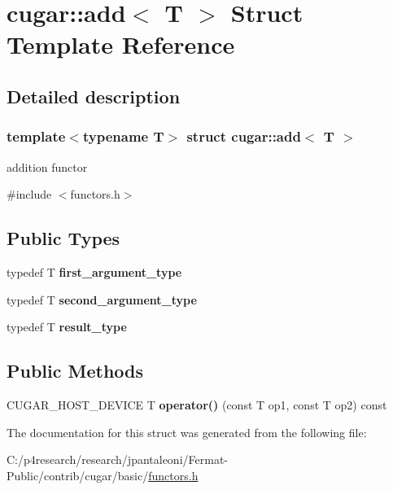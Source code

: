 \hypertarget{structcugar_1_1add}{}\section{cugar\+:\+:add$<$ T $>$ Struct Template Reference}
\label{structcugar_1_1add}


\subsection{Detailed description}
\subsubsection*{template$<$typename T$>$\newline
struct cugar\+::add$<$ T $>$}

addition functor 

{\ttfamily \#include $<$functors.\+h$>$}

\subsection*{Public Types}
\begin{DoxyCompactItemize}
\item 
\mbox{\label{structcugar_1_1add_ac7ab2b5c56d5ec89d65063ca175af238}} 
typedef T {\bfseries first\+\_\+argument\+\_\+type}
\item 
\mbox{\label{structcugar_1_1add_a678c89b01ee595ab18c1ecb2c82c7863}} 
typedef T {\bfseries second\+\_\+argument\+\_\+type}
\item 
\mbox{\label{structcugar_1_1add_af82f08ddc3654570631a0a255b69b003}} 
typedef T {\bfseries result\+\_\+type}
\end{DoxyCompactItemize}
\subsection*{Public Methods}
\begin{DoxyCompactItemize}
\item 
\mbox{\label{structcugar_1_1add_aabe41fc4256f9c98b6c592ce1b808b3b}} 
C\+U\+G\+A\+R\+\_\+\+H\+O\+S\+T\+\_\+\+D\+E\+V\+I\+CE T {\bfseries operator()} (const T op1, const T op2) const
\end{DoxyCompactItemize}


The documentation for this struct was generated from the following file\+:\begin{DoxyCompactItemize}
\item 
C\+:/p4research/research/jpantaleoni/\+Fermat-\/\+Public/contrib/cugar/basic/\hyperlink{functors_8h}{functors.\+h}\end{DoxyCompactItemize}
